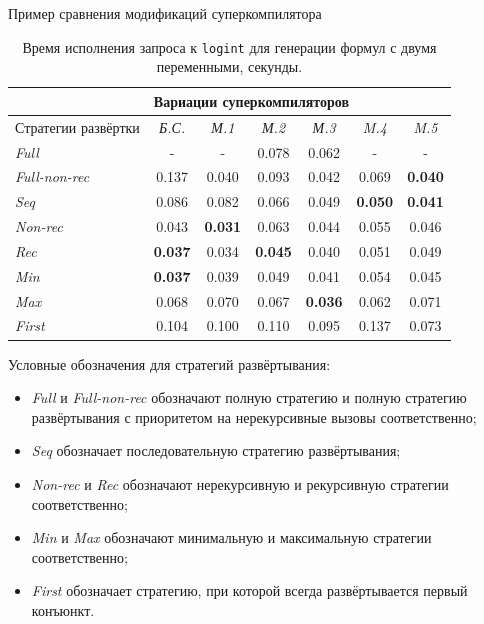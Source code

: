 \documentclass[xcolor=table]{beamer}
\begin{document}
\begin{frame}{Пример сравнения модификаций суперкомпилятора}
\begin{table}[h!]
\center
\begin{tabular}{|p{2.3cm}||c|c|c|c|c|c|}
\hline
                 & \multicolumn{6}{|l|}{Вариации суперкомпиляторов} \\ \hline
Стратегии развёртки &{\it Б.С.}&{\it М.1}&{\it М.2}&{\it М.3}&{\it M.4}&{\it M.5} \\ \hline \hline
{\it Full        }&    -        &    -        & 0.078       & 0.062      &    -        & - \\ \hline
{\it Full-non-rec}& 0.137       & 0.040       & 0.093       & 0.042      & 0.069       & {\bf 0.040} \\ \hline
{\it Seq         }& 0.086       & 0.082       & 0.066       & 0.049      & {\bf 0.050} & {\bf 0.041} \\ \hline
{\it Non-rec     }& 0.043       & {\bf 0.031} & 0.063       & 0.044      & 0.055       & 0.046 \\ \hline
{\it Rec         }& {\bf 0.037} & 0.034       & {\bf 0.045} & 0.040      & 0.051       & 0.049 \\ \hline
{\it Min         }& {\bf 0.037} & 0.039       & 0.049       & 0.041      & 0.054       & 0.045 \\ \hline
{\it Max         }& 0.068       & 0.070       & 0.067       &{\bf 0.036} & 0.062       & 0.071 \\ \hline
{\it First       }& 0.104       & 0.100       & 0.110       & 0.095      & 0.137       & 0.073 \\ \hline
\end{tabular}
\caption{Время исполнения запроса к \lstinline{logint} для генерации формул с двумя переменными, секунды.}
\label{fig:logintTest3}
\end{table}
\end{frame}

\begin{frame}
Условные обозначения для стратегий развёртывания:
\begin{itemize}
\item {\it Full} и {\it Full-non-rec} обозначают полную стратегию и полную стратегию развёртывания с приоритетом на нерекурсивные вызовы соответственно;
\item {\it Seq} обозначает последовательную стратегию развёртывания;
\item {\it Non-rec} и {\it Rec} обозначают нерекурсивную и рекурсивную стратегии соответственно;
\item {\it Min} и {\it Max} обозначают минимальную и максимальную стратегии соответственно;
\item {\it First} обозначает стратегию, при которой всегда развёртывается первый конъюнкт.
\end{itemize}
\end{frame}
\end{document}
